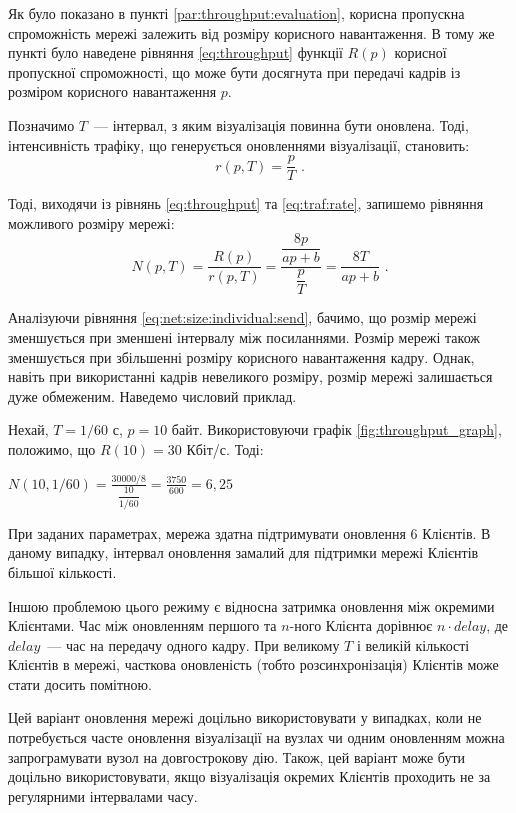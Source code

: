 \documentclass[a4paper,ukrainian,utf8,nocolumnsxix,floatsection,equationsection]{eskdtext}
\begin{document}
Як було показано в пункті \ref{par:throughput:evaluation}, корисна пропускна спроможність мережі залежить від розміру корисного навантаження. В тому же пункті було наведене рівняння \ref{eq:throughput} функції $R(p)$ корисної пропускної спроможності, що може бути досягнута при передачі кадрів із розміром корисного навантаження $p$. 

Позначимо $T$~--- інтервал, з яким візуалізація повинна бути оновлена. Тоді, інтенсивність трафіку, що генерується оновленнями візуалізації, становить:
\begin{equation}\label{eq:traf:rate}
	r(p, T) = \frac{p}{T}  \text{ .}
\end{equation}

Тоді, виходячи із рівнянь \ref{eq:throughput} та \ref{eq:traf:rate}, запишемо рівняння можливого розміру мережі:
\begin{equation}\label{eq:net:size:individual:send}
	N(p, T) = \frac{R(p)}{r(p, T)} = \frac{\dfrac{8p}{ap+b}}{\dfrac{p}{T}} = \frac{8T}{ap + b} \text{ .}
\end{equation}

Аналізуючи рівняння \ref{eq:net:size:individual:send}, бачимо, що розмір мережі зменшується при зменшені інтервалу між посиланнями. Розмір мережі також зменшується при збільшенні розміру корисного навантаження кадру. Однак, навіть при використанні кадрів невеликого розміру, розмір мережі залишається дуже обмеженим. Наведемо числовий приклад.

Нехай, $T=1/60$ с, $p = 10$ байт. Використовуючи графік \ref{fig:throughput_graph}, положимо, що $R(10) = 30$ Кбіт/с. Тоді:

$N(10, 1/60) = \frac{30000 / 8}{\dfrac{10}{1/60}} = \frac{3750}{600} = 6,25$


При заданих параметрах, мережа здатна підтримувати оновлення 6 Клієнтів. В даному випадку, інтервал оновлення замалий для підтримки мережі Клієнтів більшої кількості.

Іншою проблемою цього режиму є відносна затримка оновлення між окремими Клієнтами. Час між оновленням першого та $n$-ного Клієнта дорівнює $n \cdot delay$, де $delay$~--- час на передачу одного кадру. При великому $T$ і великій кількості Клієнтів в мережі, часткова оновленість (тобто розсинхронізація) Клієнтів може стати досить помітною.

Цей варіант оновлення мережі доцільно використовувати у випадках, коли не потребується часте оновлення візуалізації на вузлах чи одним оновленням можна запрограмувати вузол на довгострокову дію. Також, цей варіант може бути доцільно використовувати, якщо візуалізація окремих Клієнтів проходить не за регулярними інтервалами часу.
\end{document}
